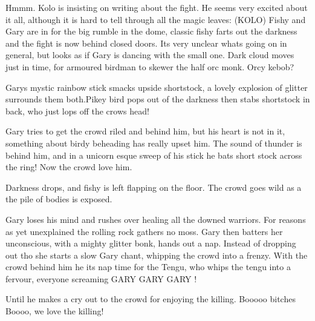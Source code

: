 Hmmm. Kolo is insisting on writing about the fight. He seems very excited about it all, although it is hard to tell through all the magic leaves: (KOLO) Fishy and Gary are in for the big rumble in the dome, classic fishy farts out the darkness and the fight is now behind closed doors. Its very unclear whats going on in general, but looks as if Gary is dancing with the small one. Dark cloud moves just in time, for armoured birdman to skewer the half orc monk. Orcy kebob?\medskip

Garys mystic rainbow stick smacks upside shortstock, a lovely explosion of glitter surrounds them both.Pikey bird pops out of the darkness then stabs shortstock in back, who just lops off the crows head!\medskip

Gary tries to get the crowd riled and behind him, but his heart is not in it, something about birdy beheading has really upset him. The sound of thunder is behind him, and in a unicorn esque sweep of his stick he bats short stock across the ring! Now the crowd love him.\medskip

Darkness drops, and fishy is left flapping on the floor. The crowd goes wild as a the pile of bodies is exposed.\medskip

Gary loses his mind and rushes over healing all the downed warriors. For reasons as yet unexplained the rolling rock gathers no moss. Gary then batters her unconscious, with a mighty glitter bonk, hands out a nap. Instead of dropping out tho she starts a slow Gary chant, whipping the crowd into a frenzy. With the crowd behind him he its nap time for the Tengu, who whips the tengu into a fervour, everyone screaming GARY GARY GARY !\medskip

Until he makes a cry out to the crowd for enjoying the killing. Booooo bitches Boooo, we love the killing!\medskip